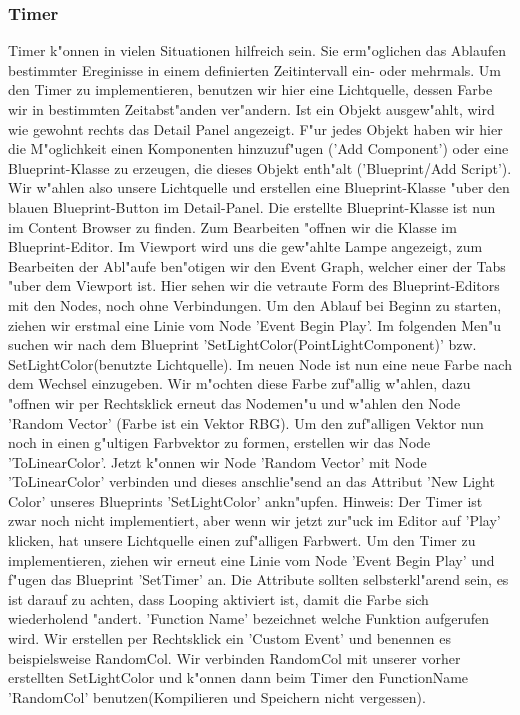 \documentclass[11pt, titlepage]{article}
\begin{document}
\subsubsection{Timer}

\noindent Timer k"onnen in vielen Situationen hilfreich sein. Sie erm"oglichen das Ablaufen bestimmter Ereginisse in einem definierten Zeitintervall ein- oder mehrmals. Um den Timer zu implementieren, benutzen wir hier eine Lichtquelle, dessen Farbe wir in bestimmten Zeitabst"anden ver"andern. \newline \newline
\noindent Ist ein Objekt ausgew"ahlt, wird wie gewohnt rechts das Detail Panel angezeigt. F"ur jedes Objekt haben wir hier die M"oglichkeit einen Komponenten hinzuzuf"ugen ('Add Component') oder eine Blueprint-Klasse zu erzeugen, die dieses Objekt enth"alt ('Blueprint/Add Script'). Wir w"ahlen also unsere Lichtquelle und erstellen eine Blueprint-Klasse "uber den blauen Blueprint-Button im Detail-Panel. \newline \newline
\noindent Die erstellte Blueprint-Klasse ist nun im Content Browser zu finden. Zum Bearbeiten "offnen wir die Klasse im Blueprint-Editor. Im Viewport wird uns die gew"ahlte Lampe angezeigt, zum Bearbeiten der Abl"aufe ben"otigen wir den Event Graph, welcher einer der Tabs "uber dem Viewport ist. Hier sehen wir die vetraute Form des Blueprint-Editors mit den Nodes, noch ohne Verbindungen. \newline
\newline
\noindent Um den Ablauf bei Beginn zu starten, ziehen wir erstmal eine Linie vom Node 'Event Begin Play'. Im folgenden Men"u suchen wir nach dem Blueprint 'SetLightColor(PointLightComponent)' bzw. SetLightColor(benutzte Lichtquelle). Im neuen Node ist nun eine neue Farbe nach dem Wechsel einzugeben. Wir m"ochten diese Farbe zuf"allig w"ahlen, dazu "offnen wir per Rechtsklick erneut das Nodemen"u und w"ahlen den Node 'Random Vector' (Farbe ist ein Vektor RBG). Um den zuf"alligen Vektor nun noch in einen g"ultigen Farbvektor zu formen, erstellen wir das Node 'ToLinearColor'. Jetzt k"onnen wir Node 'Random Vector' mit Node 'ToLinearColor' verbinden und dieses anschlie"send an das Attribut 'New Light Color' unseres Blueprints 'SetLightColor' ankn"upfen. \newline
\newline
\noindent Hinweis: Der Timer ist zwar noch nicht implementiert, aber wenn wir jetzt zur"uck im Editor auf 'Play' klicken, hat unsere Lichtquelle einen zuf"alligen Farbwert. \newline
\newline
\noindent Um den Timer zu implementieren, ziehen wir erneut eine Linie vom Node 'Event Begin Play' und f"ugen das Blueprint 'SetTimer' an. Die Attribute sollten selbsterkl"arend sein, es ist darauf zu achten, dass Looping aktiviert ist, damit die Farbe sich wiederholend "andert. 'Function Name' bezeichnet welche Funktion aufgerufen wird. Wir erstellen per Rechtsklick ein 'Custom Event' und benennen es beispielsweise RandomCol. Wir verbinden RandomCol mit unserer vorher erstellten SetLightColor und k"onnen dann beim Timer den FunctionName 'RandomCol' benutzen(Kompilieren und Speichern nicht vergessen).
\end{document}
